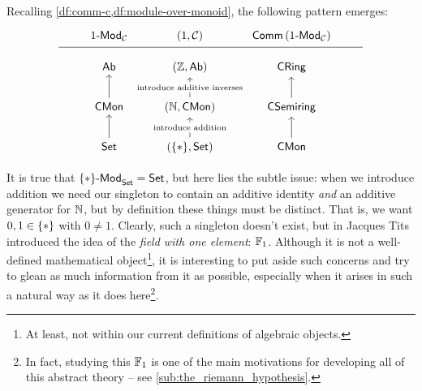         Recalling \cref{df:comm-c,df:module-over-monoid}, the following pattern emerges:
        \begin{equation*}
            \begin{tikzcd}
                & \modc{1}_\ccat & (1,\ccat) & \comm{\modc{1}_\ccat} &\\[-1.8em]
                \,\arrow[rrrr, dash] & & & & \,\\[-1.5em]
                & \Ab & (\zz,\Ab) & \CRing &\\
                & \CMon \arrow[u] & (\nn,\CMon) \arrow[u, "\text{introduce additive inverses}" description] & \CSemiring \arrow[u] &\\
                & \Set \arrow[u] & (\singleton,\Set) \arrow[u, "\text{introduce addition}" description] & \CMon \arrow[u] &
            \end{tikzcd}
        \end{equation*}

        It is true that ${{\{*\}}\hbox{-}\mathsf{Mod}}_{\mathsf{Set}}=\mathsf{Set}$, but here lies the subtle issue: when we introduce addition we need our singleton to contain an additive identity \emph{and} an additive generator for $\mathbb{N}$, but by definition these things must be distinct.
        That is, we want $0,1\in\{*\}$ with $0\neq1$.
        Clearly, such a singleton doesn't exist, but in \cite{Tits:1957tq} Jacques Tits introduced the idea of the \emph{field with one element}: $\mathbb{F}_1$.
        Although it is not a well-defined mathematical object\footnote{
            At least, not within our current definitions of algebraic objects.
        }, it is interesting to put aside such concerns and try to glean as much information from it as possible, especially when it arises in such a natural way as it does here\footnote{
            In fact, studying this $\mathbb{F}_1$ is one of the main motivations for developing all of this abstract theory -- see \cref{sub:the_riemann_hypothesis}.
        }.

